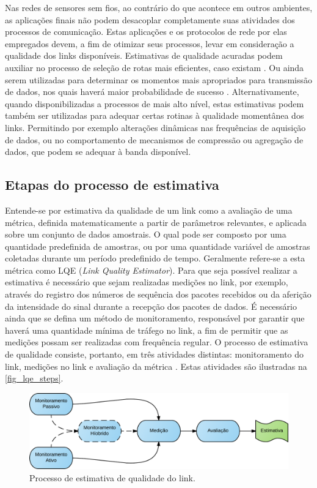\documentclass[
	12pt,				%
	openright,			%
	oneside,
	a4paper,			%
	english,			%
	french,				%
	spanish,			%
	brazil				%
	]{abntex2}
\begin{document}
Nas redes de sensores sem fios, ao contrário do que acontece em outros ambientes, as aplicações finais não podem desacoplar completamente suas atividades dos processos de comunicação. Estas aplicações e os protocolos de rede por elas empregados devem, a fim de otimizar seus processos, levar em consideração a qualidade dos links disponíveis. Estimativas de qualidade acuradas podem auxiliar no processo de seleção de rotas mais eficientes, caso existam \cite{YanjunLi2005}. Ou ainda serem utilizadas para determinar os momentos mais apropriados para transmissão de dados, nos quais haverá maior probabilidade de sucesso \cite{Srinivasan2008}. Alternativamente, quando disponibilizadas a processos de mais alto nível, estas estimativas podem também ser utilizadas para adequar certas rotinas à qualidade momentânea dos links. Permitindo por exemplo alterações dinâmicas nas frequências de aquisição de dados, ou no comportamento de mecanismos de compressão ou agregação de dados, que podem se adequar à banda disponível.

\subsection{Etapas do processo de estimativa}

Entende-se por estimativa da qualidade de um link como a avaliação de uma métrica, definida matematicamente a partir de parâmetros relevantes, e aplicada sobre um conjunto de dados amostrais. O qual pode ser composto por uma quantidade predefinida de amostras, ou por uma quantidade variável de amostras coletadas durante um período predefinido de tempo. Geralmente refere-se a esta métrica como LQE (\textit{Link Quality Estimator}). Para que seja possível realizar a estimativa é necessário que sejam realizadas medições no link, por exemplo, através do registro dos números de sequência dos pacotes recebidos ou da aferição da intensidade do sinal durante a recepção dos pacotes de dados. É necessário ainda que se defina um método de monitoramento, responsável por garantir que haverá uma quantidade mínima de tráfego no link, a fim de permitir que as medições possam ser realizadas com frequência regular. O processo de estimativa de qualidade consiste, portanto, em três atividades distintas: monitoramento do link, medições no link e avaliação da métrica \cite{Baccour2012}. Estas atividades são ilustradas na \autoref{fig_lqe_steps}.

\begin{figure}[htb]
	\caption{\label{fig_lqe_steps}Processo de estimativa de qualidade do link.}
	\begin{center}
		\includegraphics[width=\linewidth]{WSN_LQE_Steps}
	\end{center}
\end{figure}
\end{document}
